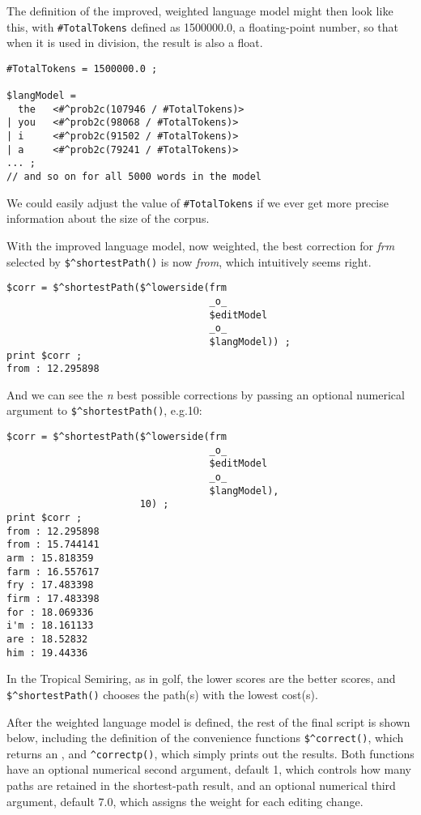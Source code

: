\noindent
The definition of the improved, weighted language model might then look like this, with
\verb!#TotalTokens! defined as 1500000.0, a floating-point number, so that
when it is used in division, the result is also a float.

\begin{Verbatim}
#TotalTokens = 1500000.0 ;

$langModel = 
  the   <#^prob2c(107946 / #TotalTokens)>
| you   <#^prob2c(98068 / #TotalTokens)>
| i     <#^prob2c(91502 / #TotalTokens)>
| a     <#^prob2c(79241 / #TotalTokens)>
... ;
// and so on for all 5000 words in the model
\end{Verbatim}

\noindent
We could easily adjust the value of \verb!#TotalTokens! if we ever get more
precise information about the size of the corpus.

With the improved language model, now weighted, the best correction for \emph{frm} selected by
\verb!$^shortestPath()! is now \emph{from}, which intuitively seems right.

\begin{Verbatim}
$corr = $^shortestPath($^lowerside(frm 
                                   _o_ 
                                   $editModel 
                                   _o_ 
                                   $langModel)) ;
print $corr ;
from : 12.295898
\end{Verbatim}

\noindent
And we can see the \emph{n} best possible corrections by passing an optional numerical
argument to \verb!$^shortestPath()!, e.g.\@ 10:

\begin{Verbatim}
$corr = $^shortestPath($^lowerside(frm 
                                   _o_ 
                                   $editModel 
                                   _o_ 
                                   $langModel), 
                       10) ;
print $corr ;
from : 12.295898
from : 15.744141
arm : 15.818359
farm : 16.557617
fry : 17.483398
firm : 17.483398
for : 18.069336
i'm : 18.161133
are : 18.52832
him : 19.44336
\end{Verbatim}

\noindent
In the Tropical Semiring, as in golf, the lower scores are the better scores,
and \verb!$^shortestPath()! chooses the path(s) with the lowest cost(s).

After the weighted language model is defined, the rest of the final script is shown below,
including the definition of the convenience 
functions \verb!$^correct()!, which returns an \fsm{},
and \verb!^correctp()!, which simply prints out the results.  Both functions have an
optional numerical second argument, default 1, which controls how many paths are
retained in the shortest-path result, and an optional numerical third argument, 
default 7.0, which assigns the
weight for each editing change.

